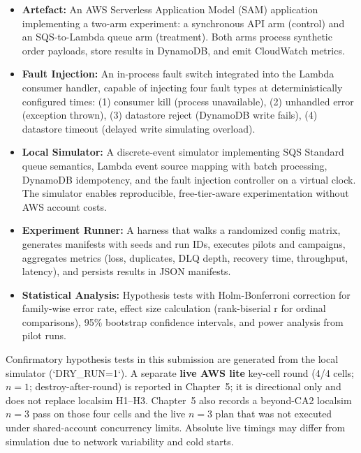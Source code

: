 \begin{itemize}
    \item \textbf{Artefact:} An AWS Serverless Application Model (SAM) application implementing a two-arm experiment: a synchronous API arm (control) and an SQS-to-Lambda queue arm (treatment). Both arms process synthetic order payloads, store results in DynamoDB, and emit CloudWatch metrics.
    
    \item \textbf{Fault Injection:} An in-process fault switch integrated into the Lambda consumer handler, capable of injecting four fault types at deterministically configured times: (1) consumer kill (process unavailable), (2) unhandled error (exception thrown), (3) datastore reject (DynamoDB write fails), (4) datastore timeout (delayed write simulating overload).
    
    \item \textbf{Local Simulator:} A discrete-event simulator implementing SQS Standard queue semantics, Lambda event source mapping with batch processing, DynamoDB idempotency, and the fault injection controller on a virtual clock. The simulator enables reproducible, free-tier-aware experimentation without AWS account costs.
    
    \item \textbf{Experiment Runner:} A harness that walks a randomized config matrix, generates manifests with seeds and run IDs, executes pilots and campaigns, aggregates metrics (loss, duplicates, DLQ depth, recovery time, throughput, latency), and persists results in JSON manifests.
    
    \item \textbf{Statistical Analysis:} Hypothesis tests with Holm-Bonferroni correction for family-wise error rate, effect size calculation (rank-biserial r for ordinal comparisons), 95\% bootstrap confidence intervals, and power analysis from pilot runs.
\end{itemize}

Confirmatory hypothesis tests in this submission are generated from the local simulator (`DRY\_RUN=1`). A separate \textbf{live AWS lite} key-cell round (4/4 cells; $n{=}1$; destroy-after-round) is reported in Chapter~5; it is directional only and does not replace localsim H1--H3. Chapter~5 also records a beyond-CA2 localsim $n{=}3$ pass on those four cells and the live $n{=}3$ plan that was not executed under shared-account concurrency limits. Absolute live timings may differ from simulation due to network variability and cold starts.

